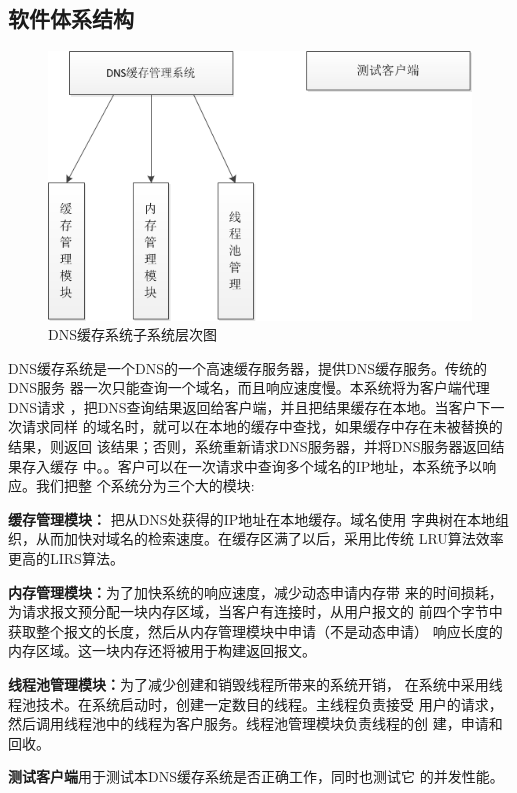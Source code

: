 \documentclass[12pt, a4paper, titlepage]{article}
\begin{document}
\subsection{软件体系结构}

\begin{figure}[H]
\centering
\includegraphics[keepaspectratio, scale=0.9]{pitures/zixitongcengcitu.png}
\caption{DNS缓存系统子系统层次图}
\end{figure}
\indent DNS缓存系统是一个DNS的一个高速缓存服务器，提供DNS缓存服务。传统的DNS服务
	器一次只能查询一个域名，而且响应速度慢。本系统将为客户端代理DNS请求
	，把DNS查询结果返回给客户端，并且把结果缓存在本地。当客户下一次请求同样
	的域名时，就可以在本地的缓存中查找，如果缓存中存在未被替换的结果，则返回
	该结果；否则，系统重新请求DNS服务器，并将DNS服务器返回结果存入缓存
	中。。客户可以在一次请求中查询多个域名的IP地址，本系统予以响应。我们把整
	个系统分为三个大的模块:
	\begin{compactitem}
	\item{\textbf{缓存管理模块：} 把从DNS处获得的IP地址在本地缓存。域名使用
	字典树\cite{IDAT}在本地组织，从而加快对域名的检索速度。在缓存区满了以后，采用比传统
	LRU算法效率更高的LIRS\cite{LIRS}算法。}
	\item{\textbf{内存管理模块：}为了加快系统的响应速度，减少动态申请内存带
	来的时间损耗，为请求报文预分配一块内存区域，当客户有连接时，从用户报文的
	前四个字节中获取整个报文的长度，然后从内存管理模块中申请（不是动态申请）
	响应长度的内存区域。这一块内存还将被用于构建返回报文。}
	\item{\textbf{线程池管理模块：}为了减少创建和销毁线程所带来的系统开销，
	在系统中采用线程池技术。在系统启动时，创建一定数目的线程。主线程负责接受
	用户的请求，然后调用线程池中的线程为客户服务。线程池管理模块负责线程的创
	建，申请和回收。}
	\item{\textbf{测试客户端}用于测试本DNS缓存系统是否正确工作，同时也测试它
	的并发性能。}
	\end{compactitem}
\end{document}
